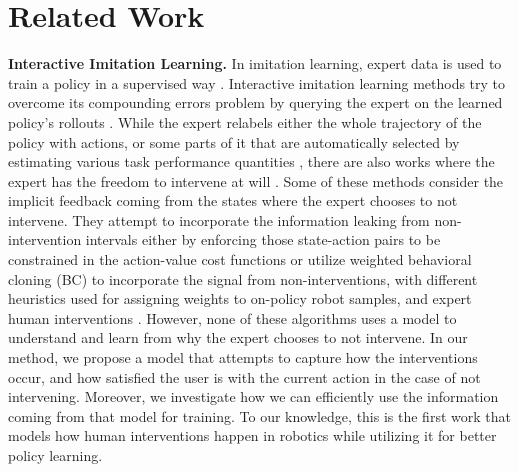 \section{Related Work}
\label{sec:related_work}
    \textbf{Interactive Imitation Learning.} In imitation learning, expert data is used to train a policy in a supervised way \cite{celemin2022interactive, argall2009survey, ho2016general, laskey2017dart, abbeel2010autononous, pomerleau1988alvinn}. Interactive imitation learning methods try to overcome its compounding errors problem \cite{ross2010efficient, ross2011reduction} by querying the expert on the learned policy's rollouts \cite{celemin2022interactive, kelly2019hgdagger, kunal2019ensembledagger, ross2011reduction, hoque2022thriftydagger,myers2023active}. While the expert relabels either the whole trajectory of the policy with actions, or some parts of it that are automatically selected by estimating various task performance quantities \cite{hoque2022thriftydagger, ross2011reduction}, there are also works where the expert has the freedom to intervene at will \cite{kelly2019hgdagger, liu2022robot, mandlekar2020humanintheloopimitationlearningusing, chisari2021correct}. Some of these methods consider the implicit feedback coming from the states where the expert chooses to not intervene. They attempt to incorporate the information leaking from non-intervention intervals either by enforcing those state-action pairs to be constrained in the action-value cost functions \cite{spencer2020learning} or utilize weighted behavioral cloning (BC) to incorporate the signal from non-interventions, with different heuristics used for assigning weights to on-policy robot samples, and expert human interventions \cite{liu2022robot, mandlekar2020humanintheloopimitationlearningusing, chisari2021correct}.
    However, none of these algorithms uses a model to understand and learn from why the expert chooses to not intervene. In our method, we propose a model that attempts to capture how the interventions occur, and how satisfied the user is with the current action in the case of not intervening. Moreover, we investigate how we can efficiently use the information coming from that model for training. To our knowledge, this is the first work that models how human interventions happen in robotics while utilizing it for better policy learning.

